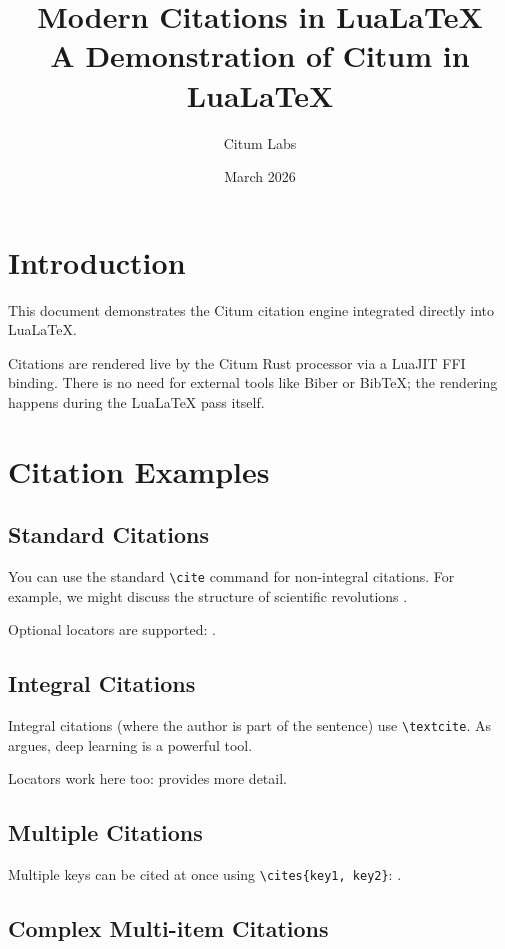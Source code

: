 \documentclass{article}
\title{Modern Citations in Lua\LaTeX\\
       A Demonstration of Citum in Lua\LaTeX}
\author{Citum Labs}
\date{March 2026}
\begin{document}
\maketitle

\section{Introduction}

This document demonstrates the Citum citation engine 
integrated directly into Lua\LaTeX. 

Citations are rendered live by the Citum Rust processor via a LuaJIT FFI 
binding. There is no need for external tools like Biber or BibTeX; the 
rendering happens during the Lua\LaTeX{} pass itself.

\section{Citation Examples}

\subsection{Standard Citations}

You can use the standard \verb|\cite| command for non-integral citations. 
For example, we might discuss the structure of scientific revolutions 
\cite{kuhn1962}.

Optional locators are supported: \cite[p. 52]{kuhn1962}.

\subsection{Integral Citations}

Integral citations (where the author is part of the sentence) use 
\verb|\textcite|. As \textcite{lecun2015} argues, deep learning is a 
powerful tool. 

Locators work here too: \textcite[ch. 3]{lecun2015} provides more detail.

\subsection{Multiple Citations}

Multiple keys can be cited at once using \verb|\cites{key1, key2}|: 
\cites{kuhn1962, lecun2015}.

\subsection{Complex Multi-item Citations}
\end{document}
